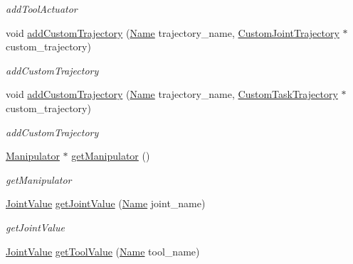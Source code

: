 \begin{DoxyCompactItemize}
\begin{DoxyCompactList}\small\item\em add\+Tool\+Actuator \end{DoxyCompactList}\item 
void \hyperlink{classrobotis__manipulator_1_1_robotis_manipulator_acba87dc54d9d75dd65d0bba0ad810ffe}{add\+Custom\+Trajectory} (\hyperlink{namespacerobotis__manipulator_a08c2d25e77a01ad75b9bb740f8ce4765}{Name} trajectory\+\_\+name, \hyperlink{classrobotis__manipulator_1_1_custom_joint_trajectory}{Custom\+Joint\+Trajectory} $\ast$custom\+\_\+trajectory)
\begin{DoxyCompactList}\small\item\em add\+Custom\+Trajectory \end{DoxyCompactList}\item 
void \hyperlink{classrobotis__manipulator_1_1_robotis_manipulator_a5d60df52f23bed89642b39af84046aa5}{add\+Custom\+Trajectory} (\hyperlink{namespacerobotis__manipulator_a08c2d25e77a01ad75b9bb740f8ce4765}{Name} trajectory\+\_\+name, \hyperlink{classrobotis__manipulator_1_1_custom_task_trajectory}{Custom\+Task\+Trajectory} $\ast$custom\+\_\+trajectory)
\begin{DoxyCompactList}\small\item\em add\+Custom\+Trajectory \end{DoxyCompactList}\item 
\hyperlink{classrobotis__manipulator_1_1_manipulator}{Manipulator} $\ast$ \hyperlink{classrobotis__manipulator_1_1_robotis_manipulator_a5c5d26ca7cd655464d453f19cb4d4929}{get\+Manipulator} ()
\begin{DoxyCompactList}\small\item\em get\+Manipulator \end{DoxyCompactList}\item 
\hyperlink{namespacerobotis__manipulator_aa0556c98c5294ccf3a96c2d0fe315e40}{Joint\+Value} \hyperlink{classrobotis__manipulator_1_1_robotis_manipulator_ae43473d4edcaafb7e7885db3276d6280}{get\+Joint\+Value} (\hyperlink{namespacerobotis__manipulator_a08c2d25e77a01ad75b9bb740f8ce4765}{Name} joint\+\_\+name)
\begin{DoxyCompactList}\small\item\em get\+Joint\+Value \end{DoxyCompactList}\item 
\hyperlink{namespacerobotis__manipulator_aa0556c98c5294ccf3a96c2d0fe315e40}{Joint\+Value} \hyperlink{classrobotis__manipulator_1_1_robotis_manipulator_a5c29e139b37a87f649b8233bd092b3f3}{get\+Tool\+Value} (\hyperlink{namespacerobotis__manipulator_a08c2d25e77a01ad75b9bb740f8ce4765}{Name} tool\+\_\+name)

\end{DoxyCompactItemize}
